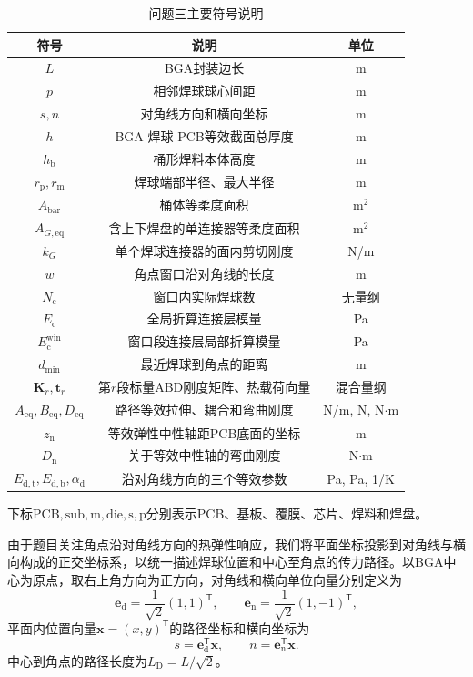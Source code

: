 \documentclass[draft,12pt,a4paper]{ctexart}
\theoremstyle{definition}
\begin{document}
\begin{table}[H]\centering
  \caption{问题三主要符号说明}\label{tab:symbol-q3}
  \small
  \begin{tabular}{ccc}
    \toprule
    符号 & 说明 & 单位 \\
    \midrule
    $L$ & BGA封装边长 & m \\
    $p$ & 相邻焊球球心间距 & m \\
    $s,n$ & 对角线方向和横向坐标 & m \\
    $h$ & BGA-焊球-PCB等效截面总厚度 & m \\
    $h_{\mathrm b}$ & 桶形焊料本体高度 & m \\
    $r_{\mathrm p},r_{\mathrm m}$ & 焊球端部半径、最大半径 & m \\
    $A_{\mathrm{bar}}$ & 桶体等柔度面积 & m$^2$ \\
    $A_{G,\mathrm{eq}}$ & 含上下焊盘的单连接器等柔度面积 & m$^2$ \\
    $k_G$ & 单个焊球连接器的面内剪切刚度 & N/m \\
    $w$ & 角点窗口沿对角线的长度 & m \\
    $N_{\mathrm c}$ & 窗口内实际焊球数 & 无量纲 \\
    $E_{\mathrm c}$ & 全局折算连接层模量 & Pa \\
    $E_{\mathrm c}^{\mathrm{win}}$ & 窗口段连接层局部折算模量 & Pa \\
    $d_{\min}$ & 最近焊球到角点的距离 & m \\
    $\mathbf K_r,\mathbf t_r$ & 第$r$段标量ABD刚度矩阵、热载荷向量 & 混合量纲 \\
    $A_{\mathrm{eq}},B_{\mathrm{eq}},D_{\mathrm{eq}}$ & 路径等效拉伸、耦合和弯曲刚度 & N/m, N, N$\cdot$m \\
    $z_{\mathrm n}$ & 等效弹性中性轴距PCB底面的坐标 & m \\
    $D_{\mathrm n}$ & 关于等效中性轴的弯曲刚度 & N$\cdot$m \\
    $E_{\mathrm{d,t}},E_{\mathrm{d,b}},\alpha_{\mathrm d}$ & 沿对角线方向的三个等效参数 & Pa, Pa, 1/K \\
    \bottomrule
  \end{tabular}
\end{table}

下标$\mathrm{PCB},\mathrm{sub},\mathrm m,\mathrm{die},\mathrm s,\mathrm p$分别表示PCB、基板、覆膜、芯片、焊料和焊盘。

由于题目关注角点沿对角线方向的热弹性响应，我们将平面坐标投影到对角线与横向构成的正交坐标系，以统一描述焊球位置和中心至角点的传力路径。以BGA中心为原点，取右上角方向为正方向，对角线和横向单位向量分别定义为
\begin{equation}\label{eq:q3-ed}
\mathbf e_{\mathrm d}=\frac{1}{\sqrt 2}(1,1)^{\mathsf T},\qquad
\mathbf e_{\mathrm n}=\frac{1}{\sqrt 2}(1,-1)^{\mathsf T},
\end{equation}
平面内位置向量$\mathbf x=(x,y)^{\mathsf T}$的路径坐标和横向坐标为
\begin{equation}\label{eq:q3-sn}
s=\mathbf e_{\mathrm d}^{\mathsf T}\mathbf x,\qquad
n=\mathbf e_{\mathrm n}^{\mathsf T}\mathbf x.
\end{equation}
中心到角点的路径长度为$L_{\mathrm D}=L/\sqrt 2$。
\end{document}
